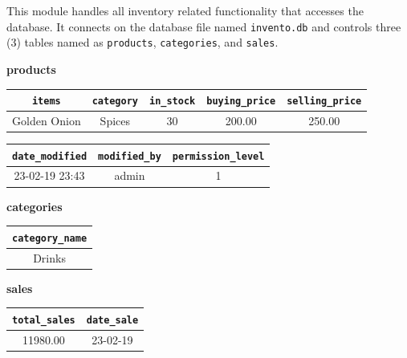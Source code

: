 \documentclass[12pt,a4paper]{article}
\renewcommand{\indent}{\hspace\parindent}
\begin{document}
            \indent This module handles all inventory related functionality that 
            accesses the database. It connects on the database file named 
            \texttt{invento.db} and controls three (3) tables named as 
            \texttt{products}, \texttt{categories}, and \texttt{sales}.

        \begin{center}
            \textbf{products}\vspace{5pt}

            \begin{tabular}{| c | c | c | c | c |}
                \hline
                \texttt{items} & \texttt{category} & \texttt{in\_stock} & \texttt{buying\_price} & \texttt{selling\_price}\\
                \hline
                Golden Onion & Spices & 30 & 200.00 & 250.00\\
                \hline
            \end{tabular}

            \begin{tabular}{| c | c | c |}
                \hline
                \texttt{date\_modified} & \texttt{modified\_by} & \texttt{permission\_level}\\
                \hline
                23-02-19 23:43 & admin & 1\\
                \hline
            \end{tabular}

        \end{center}

        \begin{multicols}{2}
        \begin{center}
            \textbf{categories}\vspace{5pt}

            \begin{tabular}{| c |}
                \hline
                \texttt{category\_name}\\
                \hline
                Drinks\\
                \hline
            \end{tabular}

            \textbf{sales}\vspace{5pt}

            \begin{tabular}{| c | c |}
                \hline
                \texttt{total\_sales} & \texttt{date\_sale}\\
                \hline
                11980.00 & 23-02-19\\
                \hline
            \end{tabular}
        \end{center}
        \end{multicols}
\end{document}
